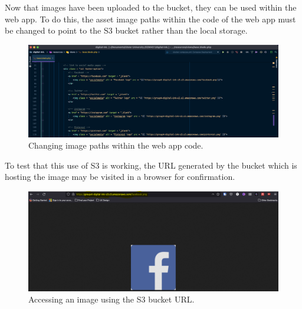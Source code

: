 \pagebreak
Now that images have been uploaded to the bucket, they can be used within the web app.
To do this, the asset image paths within the code of the web app must be changed to point to the S3 bucket
rather than the local storage.

\begin{figure}[!htbp]
    \centering
    \includegraphics[width=\textwidth]{resources/s3/s3-url-change}
    \caption{Changing image paths within the web app code.}
    \label{fig:s3-url-change}
\end{figure}

To test that this use of S3 is working, the URL generated by the bucket which is hosting the image may be visited in a
browser for confirmation.

\begin{figure}[!htbp]
    \centering
    \includegraphics[width=\textwidth]{resources/s3/s3-image-displayed}
    \caption{Accessing an image using the S3 bucket URL.}
    \label{fig:s3-image}
\end{figure}
